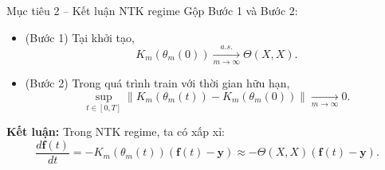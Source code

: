 \begin{frame}{Mục tiêu 2 – Kết luận NTK regime}
  Gộp Bước 1 và Bước 2:
  \begin{itemize}
    \item (Bước 1) Tại khởi tạo,
      \[
        K_m(\theta_m(0)) \xrightarrow[m\to\infty]{a.s.} \Theta(X,X).
      \]
    \item (Bước 2) Trong quá trình train với thời gian hữu hạn,
      \[
        \sup_{t\in[0,T]}
        \|K_m(\theta_m(t)) - K_m(\theta_m(0))\|
        \xrightarrow[m\to\infty]{} 0.
      \]
  \end{itemize}

  \vspace{0.2cm}
  \textbf{Kết luận:} Trong NTK regime, ta có xấp xỉ:
  \[
    \frac{d\mathbf f(t)}{dt}
      = -K_m(\theta_m(t))(\mathbf f(t)-\mathbf y)
      \approx -\Theta(X,X)(\mathbf f(t)-\mathbf y).
  \]
\end{frame}
